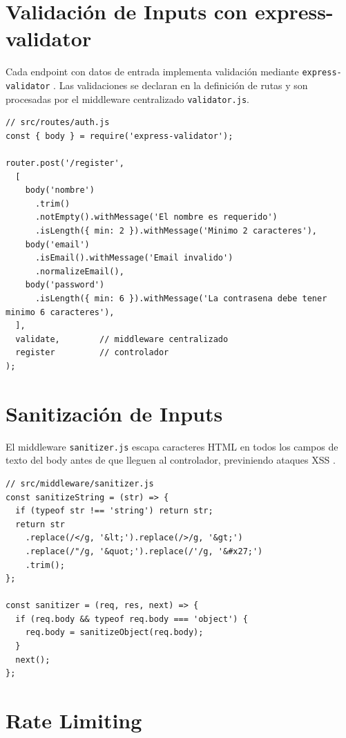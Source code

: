\section{Validación de Inputs con express-validator}

Cada endpoint con datos de entrada implementa validación mediante \texttt{express-validator} \cite{express_validator}. Las validaciones se declaran en la definición de rutas y son procesadas por el middleware centralizado \texttt{validator.js}.

\begin{lstlisting}[style=javascript, caption={Validaciones del endpoint de registro}]
// src/routes/auth.js
const { body } = require('express-validator');

router.post('/register',
  [
    body('nombre')
      .trim()
      .notEmpty().withMessage('El nombre es requerido')
      .isLength({ min: 2 }).withMessage('Minimo 2 caracteres'),
    body('email')
      .isEmail().withMessage('Email invalido')
      .normalizeEmail(),
    body('password')
      .isLength({ min: 6 }).withMessage('La contrasena debe tener minimo 6 caracteres'),
  ],
  validate,        // middleware centralizado
  register         // controlador
);
\end{lstlisting}

\section{Sanitización de Inputs}

El middleware \texttt{sanitizer.js} escapa caracteres HTML en todos los campos de texto del body antes de que lleguen al controlador, previniendo ataques XSS \cite{owasp_xss}.

\begin{lstlisting}[style=javascript, caption={Middleware sanitizador de inputs}]
// src/middleware/sanitizer.js
const sanitizeString = (str) => {
  if (typeof str !== 'string') return str;
  return str
    .replace(/</g, '&lt;').replace(/>/g, '&gt;')
    .replace(/"/g, '&quot;').replace(/'/g, '&#x27;')
    .trim();
};

const sanitizer = (req, res, next) => {
  if (req.body && typeof req.body === 'object') {
    req.body = sanitizeObject(req.body);
  }
  next();
};
\end{lstlisting}

\section{Rate Limiting}

